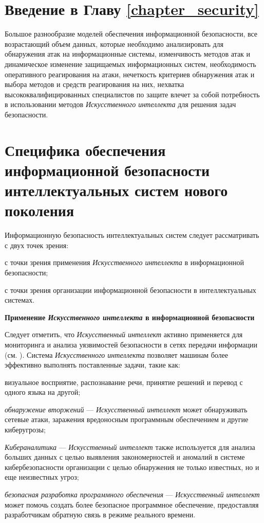 \section*{Введение в Главу \ref{chapter_security}}
Большое разнообразие моделей обеспечения информационной безопасности, все возрастающий объем данных, которые необходимо анализировать для обнаружения атак на информационные системы, изменчивость методов атак и динамическое изменение защищаемых информационных систем, необходимость оперативного реагирования на атаки, нечеткость критериев обнаружения атак и выбора методов и средств реагирования на них, нехватка высококвалифицированных специалистов по защите влечет за собой потребность в использовании методов \textit{Искусственного интеллекта} для решения задач безопасности.

\section{Специфика обеспечения информационной безопасности интеллектуальных систем нового поколения}
\label{sec_security_specifics}

Информационную безопасность интеллектуальных систем следует рассматривать с двух точек зрения:
\begin{textitemize}
	\item с точки зрения применения \textit{Искусственного интеллекта} в информационной безопасности;
	\item с точки зрения организации информационной безопасности в интеллектуальных системах.
\end{textitemize}

\textbf{Применение \textit{Искусственного интеллекта} в информационной безопасности}

Следует отметить, что \textit{Искусственный интеллект} активно применяется для мониторинга и анализа уязвимостей безопасности в сетях передачи информации (см. ). Система \textit{Искусственного интеллекта} позволяет машинам более эффективно выполнять поставленные задачи, такие как:

\begin{textitemize}
	\item визуальное восприятие, распознавание речи, принятие решений и перевод с одного языка на другой;
	
	\item \textit{обнаружение вторжений} --- \textit{Искусственный интеллект} может обнаруживать сетевые атаки, заражения вредоносным программным обеспечением и другие киберугрозы;
	
	\item \textit{Кибераналитика} --- \textit{Искусственный интеллект} также используется для анализа больших данных с целью выявления закономерностей и аномалий в системе кибербезопасности организации с целью обнаружения не только известных, но и еще неизвестных угроз;
	
	\item \textit{безопасная разработка программного обеспечения} --- \textit{Искусственный интеллект} может помочь создать более безопасное программное обеспечение, предоставляя разработчикам обратную связь в режиме реального времени.
\end{textitemize}

